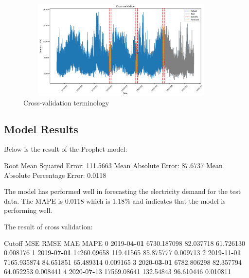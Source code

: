 \documentclass[mstat,12pt]{unswthesis}
\newenvironment{Shaded}{\begin{snugshade}}{\end{snugshade}}
\newcommand{\DecValTok}[1]{\textcolor[rgb]{0.00,0.00,0.81}{#1}}
\newcommand{\ErrorTok}[1]{\textcolor[rgb]{0.64,0.00,0.00}{\textbf{#1}}}
\newcommand{\FloatTok}[1]{\textcolor[rgb]{0.00,0.00,0.81}{#1}}
\newcommand{\NormalTok}[1]{#1}
\newcommand{\OperatorTok}[1]{\textcolor[rgb]{0.81,0.36,0.00}{\textbf{#1}}}
\begin{document}
\begin{figure}[H]
\centering
\includegraphics[width=0.95\textwidth, height=5cm]{cutoff_crossvalidation.png}
\caption{Cross-validation terminology}\label{cross_validation_output}
\end{figure}

\subsection{Model Results}\label{model-results}

Below is the result of the Prophet model:

\begin{Shaded}
\begin{Highlighting}[]
\NormalTok{Root Mean Squared Error: }\FloatTok{111.5663}
\NormalTok{Mean Absolute Error: }\FloatTok{87.6737}
\NormalTok{Mean Absolute Percentage Error: }\FloatTok{0.0118}
\end{Highlighting}
\end{Shaded}

The model has performed well in forecasting the electricity demand for
the test data. The MAPE is 0.0118 which is 1.18\% and indicates that the
model is performing well.

The result of cross validation:

\begin{Shaded}
\begin{Highlighting}[]
\NormalTok{    Cutoff      MSE           RMSE          MAE         MAPE}
\DecValTok{0}   \DecValTok{2019}\OperatorTok{{-}}\DecValTok{0}\ErrorTok{4}\OperatorTok{{-}}\DecValTok{0}\ErrorTok{1}  \FloatTok{6730.187098}   \FloatTok{82.037718}     \FloatTok{61.726130}   \FloatTok{0.008176}
\DecValTok{1}   \DecValTok{2019}\OperatorTok{{-}}\DecValTok{0}\ErrorTok{7}\OperatorTok{{-}}\DecValTok{0}\ErrorTok{1}  \FloatTok{14260.09658}   \FloatTok{119.41565}     \FloatTok{85.875777}   \FloatTok{0.009713}
\DecValTok{2}   \DecValTok{2019}\OperatorTok{{-}}\DecValTok{11}\OperatorTok{{-}}\DecValTok{0}\ErrorTok{1}  \FloatTok{7165.935874}   \FloatTok{84.651851}     \FloatTok{65.489314}   \FloatTok{0.009165}
\DecValTok{3}   \DecValTok{2020}\OperatorTok{{-}}\DecValTok{0}\ErrorTok{3}\OperatorTok{{-}}\DecValTok{0}\ErrorTok{1}  \FloatTok{6782.806298}   \FloatTok{82.357794}     \FloatTok{64.052253}   \FloatTok{0.008441}
\DecValTok{4}   \DecValTok{2020}\OperatorTok{{-}}\DecValTok{0}\ErrorTok{7}\OperatorTok{{-}}\DecValTok{13}  \FloatTok{17569.08641}   \FloatTok{132.54843}     \FloatTok{96.610446}   \FloatTok{0.010811}
\end{Highlighting}
\end{Shaded}
\end{document}
